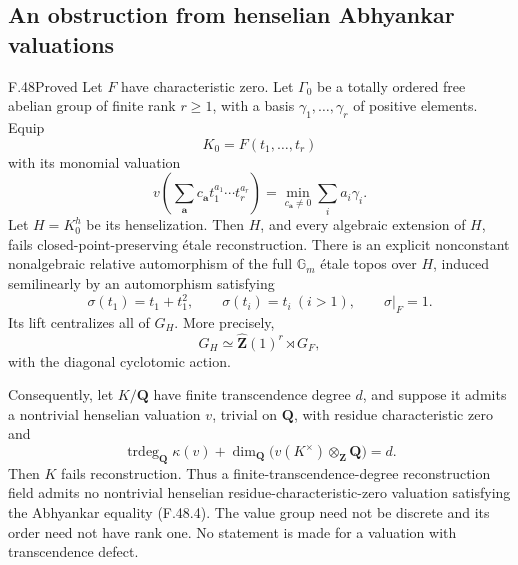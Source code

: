 \subsection{An obstruction from henselian Abhyankar valuations}

\begin{claim}{F.48}{Proved}
Let \(F\) have characteristic zero. Let \(\Gamma_0\) be a totally ordered free abelian group of finite rank \(r\geq1\), with a basis \(\gamma_1,\ldots,\gamma_r\) of positive elements. Equip
\[
             K_0=F(t_1,\ldots,t_r)
\]
with its monomial valuation
\[
 v\left(\sum_{\boldsymbol a}c_{\boldsymbol a}
                    t_1^{a_1}\cdots t_r^{a_r}\right)
       =\min_{c_{\boldsymbol a}\ne0}\sum_i a_i\gamma_i.
 \tag{F.48.1}
\]
Let \(H=K_0^h\) be its henselization. Then \(H\), and every algebraic extension of \(H\), fails closed-point-preserving étale reconstruction. There is an explicit nonconstant nonalgebraic relative automorphism of the full \(\mathbb G_m\) étale topos over \(H\), induced semilinearly by an automorphism satisfying
\[
 \sigma(t_1)=t_1+t_1^2,\qquad
 \sigma(t_i)=t_i\ (i>1),\qquad \sigma|_F=1.
 \tag{F.48.2}
\]
Its lift centralizes all of \(G_H\). More precisely,
\[
                  G_H\simeq\widehat{\mathbf Z}(1)^r\rtimes G_F,
 \tag{F.48.3}
\]
with the diagonal cyclotomic action.

Consequently, let \(K/\mathbf Q\) have finite transcendence degree \(d\), and suppose it admits a nontrivial henselian valuation \(v\), trivial on \(\mathbf Q\), with residue characteristic zero and
\[
 \operatorname{trdeg}_{\mathbf Q}\kappa(v)
       +\dim_{\mathbf Q}\bigl(v(K^\times)\otimes_{\mathbf Z}\mathbf Q\bigr)
       =d.
 \tag{F.48.4}
\]
Then \(K\) fails reconstruction. Thus a finite-transcendence-degree reconstruction field admits no nontrivial henselian residue-characteristic-zero valuation satisfying the Abhyankar equality (F.48.4). The value group need not be discrete and its order need not have rank one. No statement is made for a valuation with transcendence defect.
\end{claim}
